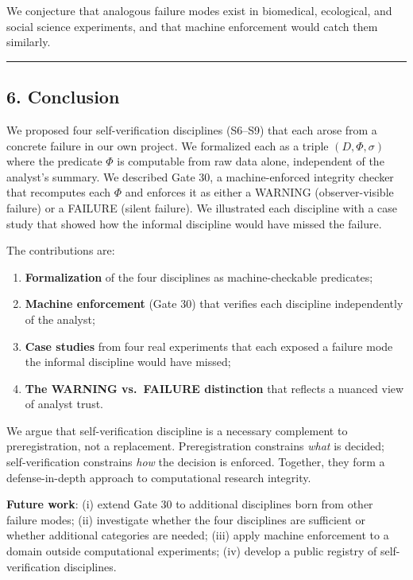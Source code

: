 \documentclass[
]{article}
\providecommand{\tightlist}{%
  \setlength{\itemsep}{0pt}\setlength{\parskip}{0pt}}
\begin{document}
We conjecture that analogous failure modes exist in biomedical,
ecological, and social science experiments, and that machine enforcement
would catch them similarly.

\begin{center}\rule{0.5\linewidth}{0.5pt}\end{center}

\subsection{6. Conclusion}\label{conclusion}

We proposed four self-verification disciplines (S6--S9) that each arose
from a concrete failure in our own project. We formalized each as a
triple \((D, \Phi, \sigma)\) where the predicate \(\Phi\) is computable
from raw data alone, independent of the analyst's summary. We described
Gate 30, a machine-enforced integrity checker that recomputes each
\(\Phi\) and enforces it as either a WARNING (observer-visible failure)
or a FAILURE (silent failure). We illustrated each discipline with a
case study that showed how the informal discipline would have missed the
failure.

The contributions are:

\begin{enumerate}
\def\labelenumi{\arabic{enumi}.}
\tightlist
\item
  \textbf{Formalization} of the four disciplines as machine-checkable
  predicates;
\item
  \textbf{Machine enforcement} (Gate 30) that verifies each discipline
  independently of the analyst;
\item
  \textbf{Case studies} from four real experiments that each exposed a
  failure mode the informal discipline would have missed;
\item
  \textbf{The WARNING vs.~FAILURE distinction} that reflects a nuanced
  view of analyst trust.
\end{enumerate}

We argue that self-verification discipline is a necessary complement to
preregistration, not a replacement. Preregistration constrains
\emph{what} is decided; self-verification constrains \emph{how} the
decision is enforced. Together, they form a defense-in-depth approach to
computational research integrity.

\textbf{Future work}: (i) extend Gate 30 to additional disciplines born
from other failure modes; (ii) investigate whether the four disciplines
are sufficient or whether additional categories are needed; (iii) apply
machine enforcement to a domain outside computational experiments; (iv)
develop a public registry of self-verification disciplines.
\end{document}
